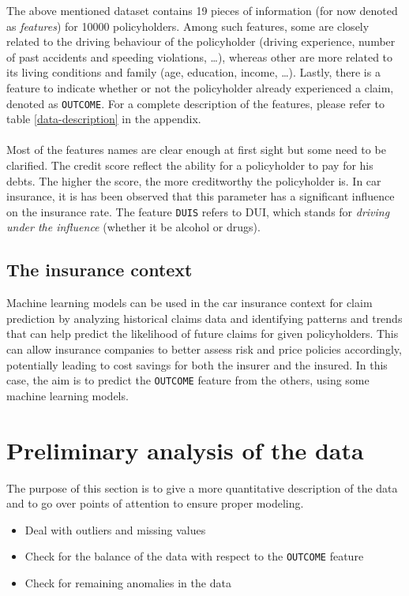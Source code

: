 \documentclass[a4paper,11pt, titlepage]{article}
\begin{document}
The above mentioned dataset contains 19 pieces of information (for now denoted as \textsl{features}) for 10000 policyholders. Among such features, some are closely related to the driving behaviour of the policyholder (driving experience, number of past accidents and speeding violations, \dots), whereas other are more related to its living conditions and family (age, education, income, \dots). Lastly, there is a feature to indicate whether or not the policyholder already experienced a claim, denoted as {\tt OUTCOME}. For a complete description of the features, please refer to table \ref{data-description} in the appendix. \\
\\
\noindent Most of the features names are clear enough at first sight but some need to be clarified. The credit score reflect the ability for a policyholder to pay for his debts. The higher the score, the more creditworthy the policyholder is. In car insurance, it is has been observed that this parameter has a significant influence on the insurance rate. The feature {\tt DUIS} refers to DUI, which stands for \textsl{driving under the influence} (whether it be alcohol or drugs).

\subsection{The insurance context}

Machine learning models can be used in the car insurance context for claim prediction by analyzing historical claims data and identifying patterns and trends that can help predict the likelihood of future claims for given policyholders. This can allow insurance companies to better assess risk and price policies accordingly, potentially leading to cost savings for both the insurer and the insured. In this case, the aim is to predict the {\tt OUTCOME} feature from the others, using some machine learning models. 


\section{Preliminary analysis of the data} \label{analysis}

The purpose of this section is to give a more quantitative description of the data and to go over points of attention to ensure proper modeling.
\begin{itemize}
    \item Deal with outliers and missing values
    \item Check for the balance of the data with respect to the {\tt OUTCOME} feature
    \item Check for remaining anomalies in the data 
\end{itemize}
\end{document}
